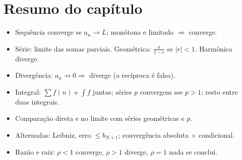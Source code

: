 \section*{Resumo do capítulo}
\begin{itemize}
\item Sequência converge se $a_n\to L$; monótona e limitada $\Rightarrow$ converge.
\item Série: limite das somas parciais. Geométrica: $\frac a{1-r}$ se $|r|<1$. Harmônica diverge.
\item Divergência: $a_n\not\to0\Rightarrow$ diverge (a recíproca é falsa).
\item Integral: $\sum f(n)$ e $\int f$ juntas; séries $p$ convergem sse $p>1$; resto entre duas integrais.
\item Comparação direta e no limite com séries geométricas e $p$.
\item Alternadas: Leibniz, erro $\le b_{N+1}$; convergência absoluta $\times$ condicional.
\item Razão e raiz: $\rho<1$ converge, $\rho>1$ diverge, $\rho=1$ nada se conclui.
\end{itemize}


